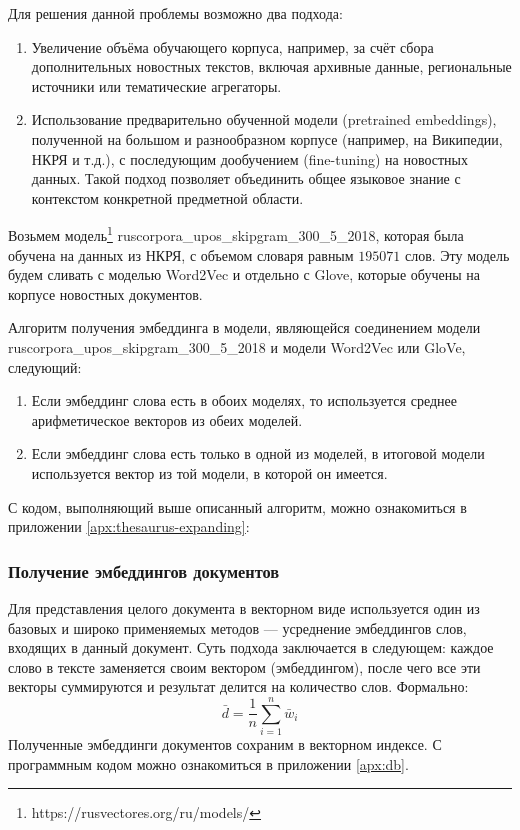 \documentclass[coursework]{SCWorks}
\begin{document}
Для решения данной проблемы возможно два подхода:
\begin{enumerate}
    \item Увеличение объёма обучающего корпуса, например, за счёт сбора дополнительных новостных текстов, включая архивные данные, региональные источники или тематические агрегаторы.
    
    \item Использование предварительно обученной модели (pretrained embeddings), полученной на большом и разнообразном корпусе (например, на Википедии, НКРЯ и т.д.), с последующим дообучением (fine-tuning) на новостных данных. Такой подход позволяет объединить общее языковое знание с контекстом конкретной предметной области.
\end{enumerate}
    
Возьмем модель\footnote{https://rusvectores.org/ru/models/} ruscorpora\_upos\_skipgram\_300\_5\_2018, которая была обучена на данных из НКРЯ, с объемом словаря равным $195 071$ слов. Эту модель будем сливать с моделью Word2Vec и отдельно с Glove, которые обучены на корпусе новостных документов.

Алгоритм получения эмбеддинга в модели, являющейся соединением модели ruscorpora\_upos\_skipgram\_300\_5\_2018 и модели Word2Vec или GloVe, следующий:
\begin{enumerate}
    \item Если эмбеддинг слова есть в обоих моделях, то используется среднее арифметическое векторов из обеих моделей.
    \item Если эмбеддинг слова есть только в одной из моделей, в итоговой модели используется вектор из той модели, в которой он имеется.
\end{enumerate}

С кодом, выполняющий выше описанный алгоритм, можно ознакомиться в приложении \ref{apx:thesaurus-expanding}:

\subsubsection{Получение эмбеддингов документов}
Для представления целого документа в векторном виде используется один из базовых и широко применяемых методов — усреднение эмбеддингов слов, входящих в данный документ. Суть подхода заключается в следующем: каждое слово в тексте заменяется своим вектором (эмбеддингом), после чего все эти векторы суммируются и результат делится на количество слов. Формально:
$$
    \bar{d} = \frac{1}{n} \sum_{i = 1}^n \bar{w}_i
$$
Полученные эмбеддинги документов сохраним в векторном индексе. С программным кодом можно ознакомиться в приложении \ref{apx:db}.
\end{document}
